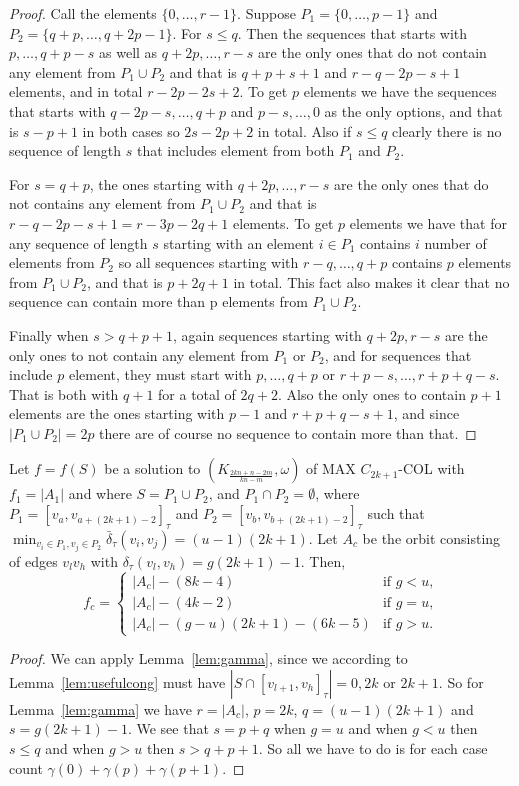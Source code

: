 \documentclass[11pt,a4paper]{article}
\begin{document}
\begin{proof}
Call the elements $\{0,\ldots,r-1\}$. Suppose $P_1 = \{0,\ldots,p-1\}$ and $P_2 = \{q+p,\ldots,q+2p-1\}$. 
For $s \leq q$. Then the sequences that starts with $p,\ldots,q+p-s$ as well as $q+2p,\ldots,r-s$ are the only ones that do not contain any element from $P_1 \cup P_2$ and that is $q+p+s+1$ and $r-q-2p-s+1$ elements, and in total $r-2p-2s+2$. To get $p$ elements we have the sequences that starts with $q-2p-s,\ldots,q+p$ and $p-s,\ldots,0$ as the only options, and that is $s-p+1$ in both cases so $2s-2p+2$ in total. Also if $s \leq q$ clearly there is no sequence of length $s$ that includes element from both $P_1$ and $P_2$.

For $s=q+p$, the ones starting with $q+2p,\ldots,r-s$ are the only ones that do not contains any element from $P_1 \cup P_2$ and that is $r-q-2p-s+1=r-3p-2q+1$ elements. To get $p$ elements we have that for any sequence of length $s$ starting with an element $i \in P_1$ contains $i$ number of elements from $P_2$ so all sequences starting with $r-q,\ldots,q+p$ contains $p$ elements from $P_1 \cup P_2$, and that is $p+2q+1$ in total. This fact also makes it clear that no sequence can contain more than p elements from $P_1 \cup P_2$.

Finally when $s > q+p+1$, again sequences starting with $q+2p,r-s$ are the only ones to not contain any element from $P_1$ or $P_2$, and for sequences that include $p$ element, they must start with $p,\ldots,q+p$ or $r+p-s,\ldots,r+p+q-s$. That is both with $q+1$ for a total of $2q+2$. Also the only ones to contain $p+1$ elements are the ones starting with $p-1$ and $r+p+q-s+1$, and since $|P_1 \cup P_2| = 2p$ there are of course no sequence to contain more than that.
\end{proof}

 
\begin{lemma}
\label{lem:corw}
Let $f=f(S)$ be a solution to $(K_{\frac{2kn+n-2m}{kn-m}},\omega)$ of {\sc MAX $C_{2k+1}$-COL} with $f_1 = |A_1|$ and where $S = P_1 \cup P_2$, and $P_1 \cap P_2 = \emptyset$, where
$P_1 = [v_a,v_{a+(2k+1)-2}]_{\tau}$
and 
$P_2 = [v_b,v_{b+(2k+1)-2}]_{\tau}$
such that 
$\min_{v_i\in P_1, v_j \in P_2}{\bar{\delta}_{\tau}(v_i,v_j)} = (u-1)(2k+1)$.
Let $A_c$ be the orbit consisting of edges $v_l v_h$ with $\delta_{\tau}(v_l,v_h)=g(2k+1)-1$. Then,
\[
f_c = \begin{cases}
  |A_c|-(8k-4) & \text{if $g < u$,} \\
  |A_c|-(4k-2) & \text{if $g = u$,} \\
  |A_c|-(g-u)(2k+1)-(6k-5) & \text{if $g > u$.}
\end{cases}
\]
\end{lemma}
\begin{proof}
We can apply Lemma~\ref{lem:gamma}, since we according to Lemma~\ref{lem:usefulcong} must have $|S \cap [v_{l+1},v_h]_{\tau}|=0,2k$ or $2k+1$. So for Lemma~\ref{lem:gamma} we have $r=|A_c|$, $p=2k$, $q=(u-1)(2k+1)$ and $s=g(2k+1)-1$. We see that $s=p+q$ when $g=u$ and when $g<u$ then $s\leq q$ and when $g > u$ then $s > q+p+1$. So all we have to do is for each case count $\gamma(0)+\gamma(p)+\gamma(p+1)$.
\end{proof}
\end{document}
